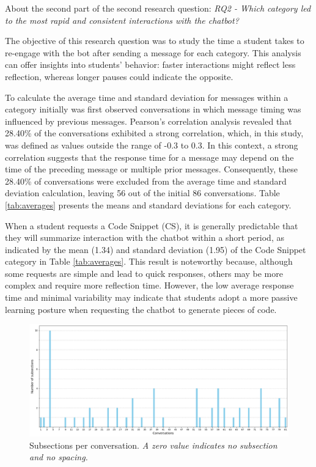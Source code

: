 \documentclass[a4paper,twoside]{article}
\begin{document}
About the second part of the second research question: \textit{RQ2 - Which
category led to the most rapid and consistent interactions with the chatbot?}

The objective of this research question was to study the time a student takes to
re-engage with the bot after sending a message for each category. This analysis
can offer insights into students' behavior: faster interactions might reflect
less reflection, whereas longer pauses could indicate the opposite.

To calculate the average time and standard deviation for messages within a
category initially was first observed conversations in which message timing was
influenced by previous messages. Pearson's correlation analysis revealed that
28.40\% of the conversations exhibited a strong correlation, which, in this
study, was defined as values outside the range of -0.3 to 0.3. In this context,
a strong correlation suggests that the response time for a message may depend
on the time of the preceding message or multiple prior messages. Consequently,
these 28.40\% of conversations were excluded from the average time and standard
deviation calculation, leaving 56 out of the initial 86 conversations. Table
\ref{tab:averages} presents the means and standard deviations for each category.

When a student requests a Code Snippet (CS), it is generally predictable that
they will summarize interaction with the chatbot within a short period, as
indicated by the mean (1.34) and standard deviation (1.95) of the Code Snippet
category in Table \ref{tab:averages}. This result is noteworthy because,
although some requests are simple and lead to quick responses, others may be
more complex and require more reflection time. However, the low average response
time and minimal variability may indicate that students adopt a more passive
learning posture when requesting the chatbot to generate pieces of code.

\begin{figure}[htbp]
  \centering
  \includegraphics[scale=0.39]{img/figure3.png}
  \caption{Subsections per conversation. \textit{A zero value indicates
  no subsection and no spacing.}}
  \label{fig:graph3}
\end{figure}
\end{document}

